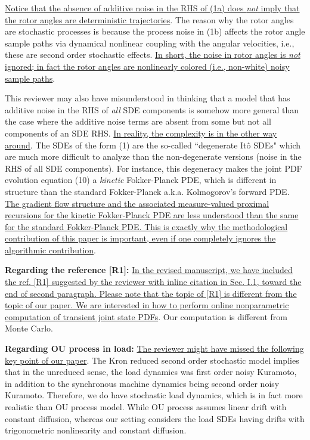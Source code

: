 \documentclass[12pt,onecolumn]{IEEEtran}
\begin{document}
{{\ul{Notice that the absence of additive noise in the RHS of (1a) does \emph{not} imply that the rotor angles are deterministic trajectories}. The reason why the rotor angles are stochastic processes is because the process noise in (1b) affects the rotor angle sample paths via dynamical nonlinear coupling with the angular velocities, i.e., these are second order stochastic effects. \ul{In short, the noise in rotor angles is \emph{not} ignored; in fact the rotor angles are nonlinearly colored (i.e., non-white) noisy sample paths}. 

This reviewer may also have misunderstood in thinking that a model that has additive noise in the RHS of \emph{all} SDE components is somehow more general than the case where the additive noise terms are absent from some but not all components of an SDE RHS. \ul{In reality, the complexity is in the other way around}. The SDEs of the form (1) are the so-called ``degenerate It\^{o} SDEs" which are much more difficult to analyze than the non-degenerate versions (noise in the RHS of all SDE components). For instance, this degeneracy makes the joint PDF evolution equation (10) a \emph{kinetic} Fokker-Planck PDE, which is different in structure than the standard Fokker-Planck a.k.a. Kolmogorov's forward PDE. \ul{The gradient flow structure and the associated measure-valued proximal recursions for the kinetic Fokker-Planck PDE are less understood than the same for the standard Fokker-Planck PDE. This is exactly why the methodological contribution of this paper is important, even if one completely ignores the algorithmic contribution}. 

\textbf{Regarding the reference [R1]:} \ul{In the revised manuscript, we have included the ref. [R1] suggested by the reviewer with inline citation in Sec. I.1, toward the end of second paragraph. Please note that the topic of [R1] is different from the topic of our paper. We are interested in how to perform online nonparametric computation of transient joint state PDFs}. Our computation is different from Monte Carlo.

\textbf{Regarding OU process in load:} \ul{The reviewer might have missed the following key point of our paper}. The Kron reduced second order stochastic model implies that in the unreduced sense, the load dynamics was first order noisy Kuramoto, in addition to the synchronous machine dynamics being second order noisy Kuramoto. Therefore, we do have stochastic load dynamics, which is in fact more realistic than OU process model. While OU process assumes linear drift with constant diffusion, whereas our setting considers the load SDEs having drifts with trigonometric nonlinearity and constant diffusion.

}}
\end{document}
